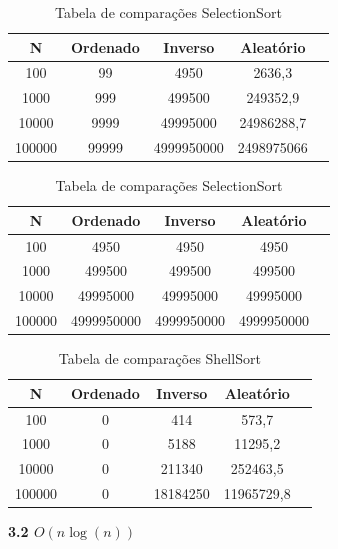 \documentclass[10pt]{article}
\begin{document}
\begin{table}[H]
  \parbox{.45\linewidth}{
    \centering
    \caption{Tabela de comparações InsertionSort}
    \begin{tabular}{|c|c|c|c|c|}
    \hline
    N & Ordenado & Inverso & Aleatório \\ \hline
    100 & 99 & 4950 & 2636,3 \\ \hline
    1000 & 999 & 499500 & 249352,9 \\ \hline
    10000 & 9999 & 49995000 & 24986288,7 \\ \hline
    100000 & 99999 & 4999950000 & 2498975066 \\ \hline
    \end{tabular}
  }
  \hfill
  \parbox{.45\linewidth}{
    \centering
    \caption{Tabela de comparações SelectionSort}
    \begin{tabular}{|c|c|c|c|c|}
    \hline
    N & Ordenado & Inverso & Aleatório \\ \hline
    100 & 4950 & 4950 & 4950 \\ \hline
    1000 & 499500 & 499500 & 499500 \\ \hline
    10000 & 49995000 & 49995000 & 49995000 \\ \hline
    100000 & 4999950000 & 4999950000 & 4999950000 \\ \hline
    \end{tabular}
  }
\end{table}

\begin{table}[H]
  \centering
  \caption{Tabela de comparações ShellSort}
  \begin{tabular}{|c|c|c|c|c|}
  \hline
  N & Ordenado & Inverso & Aleatório \\ \hline
  100 & 0 & 414 & 573,7 \\ \hline
  1000 & 0 & 5188 & 11295,2 \\ \hline
  10000 & 0 & 211340 & 252463,5 \\ \hline
  100000 & 0 & 18184250 & 11965729,8 \\ \hline
  \end{tabular}
\end{table}

\vspace{0.5cm}

\textbf{3.2 $O(n \log(n))$}
\end{document}

